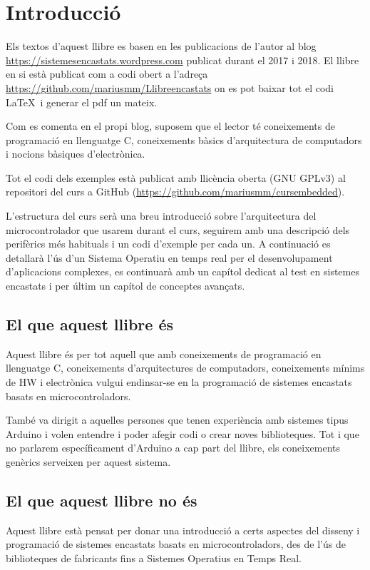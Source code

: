 
\chapter{Introducció}
Els textos d'aquest llibre es basen en les publicacions de l'autor al blog \url{https://sistemesencastats.wordpress.com} publicat durant el 2017 i 2018. El llibre en si està publicat com a codi obert a l'adreça \url{https://github.com/mariusmm/Llibreencastats} on es pot baixar tot el codi \LaTeX\ i generar el pdf un mateix.

Com es comenta en el propi blog, suposem que el lector té coneixements de programació en llenguatge C, coneixements bàsics d'arquitectura de computadors i nocions bàsiques d'electrònica.

Tot el codi dels exemples està publicat amb llicència oberta (GNU GPLv3) \cite{gplv3} al repositori del curs a GitHub (\url{https://github.com/mariusmm/cursembedded}).

L'estructura del curs serà una breu introducció sobre l'arquitectura del microcontrolador que usarem durant el curs, seguirem amb una descripció dels perifèrics més habituals i un codi d'exemple per cada un. A continuació es detallarà l'ús d'un Sistema Operatiu en temps real per el desenvolupament d'aplicacions complexes, es continuarà amb un capítol dedicat al test en sistemes encastats i per últim un capítol de conceptes avançats.

\section{El que aquest llibre és}
Aquest llibre és per tot aquell que amb coneixements de programació en llenguatge C, coneixements d'arquitectures de computadors, coneixements mínims de HW i electrònica vulgui endinsar-se en la programació de sistemes encastats basats en microcontroladors.

També va dirigit a aquelles persones que tenen experiència amb sistemes tipus Arduino i volen entendre i poder afegir codi o crear noves biblioteques. Tot i que no parlarem específicament d'Arduino a cap part del llibre, els coneixements genèrics serveixen per aquest sistema.

\section{El que aquest llibre no és}
Aquest llibre està pensat per donar una introducció a certs aspectes del disseny i programació de sistemes encastats basats en microcontroladors, des de l'ús de biblioteques de fabricants fins a Sistemes Operatius en Temps Real.


